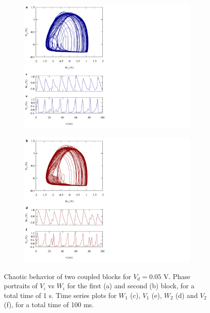 \begin{figure}[!htbp]
    \centering
    \begin{minipage}{.49\textwidth}
        \begin{subfigure}{\linewidth}
            \centering
            \includegraphics[width=\linewidth,trim={0cm 0 11cm 0},clip,center]
            {../blocks/2_blocks/4e4_points/plots/waveforms_1.pdf}
        \end{subfigure}
    \end{minipage}
    \begin{minipage}{.49\textwidth}
        \begin{subfigure}{\linewidth}
            \centering
            \includegraphics[width=\linewidth,trim={0cm 0 11cm 0},clip,center]
            {../blocks/2_blocks/4e4_points/plots/waveforms_2.pdf}
        \end{subfigure}
    \end{minipage}
    \caption{Chaotic behavior of two coupled blocks for $V_d=0.05$ V.
    Phase portraits of $V_i$ vs $W_i$ for the first (a) and second (b) block, for a total time of 1 s.
    Time series plots for $W_1$ (c), $V_1$ (e), $W_2$ (d) and $V_2$ (f), for a total time of 100 ms.
    }\label{fig:2 blocks waveforms}
\end{figure}

